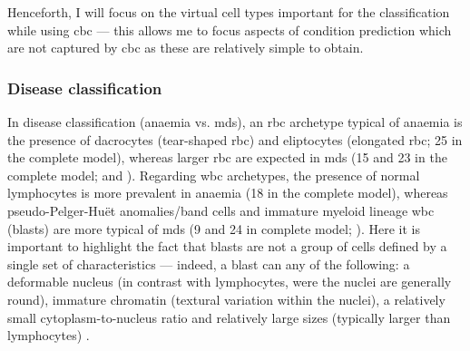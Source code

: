 Henceforth, I will focus on the virtual cell types important for the classification while using \ac{cbc} --- this allows me to focus aspects of condition prediction which are not captured by \ac{cbc} as these are relatively simple to obtain. 

\subsubsection{Disease classification} 

In disease classification (anaemia vs. \ac{mds}), an \ac{rbc} archetype typical of anaemia is the presence of dacrocytes (tear-shaped \ac{rbc}) and eliptocytes (elongated \ac{rbc}; 25 in the complete model), whereas larger \ac{rbc} are expected in \ac{mds} (15 and 23 in the complete model;  and ). Regarding \ac{wbc} archetypes, the presence of normal lymphocytes is more prevalent in anaemia (18 in the complete model), whereas pseudo-Pelger-Huët anomalies/band cells and immature myeloid lineage \ac{wbc} (blasts) are more typical of \ac{mds} (9 and 24 in complete model; ). Here it is important to highlight the fact that blasts are not a group of cells defined by a single set of characteristics --- indeed, a blast can any of the following: a deformable nucleus (in contrast with lymphocytes, were the nuclei are generally round), immature chromatin (textural variation within the nuclei), a relatively small cytoplasm-to-nucleus ratio and relatively large sizes (typically larger than lymphocytes) \cite{Bain2004-uq,Bain2005-zg,Bain2014-oc}.

\begin{figure}[!ht]
    \label{fig:mile-vice-vcq-so-disease-classification}
\end{figure}

\begin{figure}[!ht]
    \label{fig:rbc-disease-classification-examples}
\end{figure}

